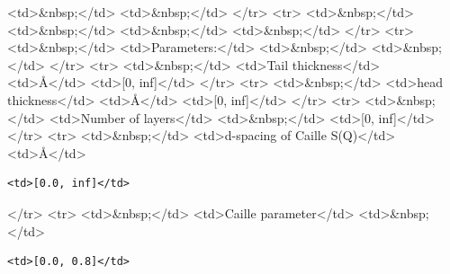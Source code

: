 \textless{}td\textgreater{}\&nbsp;\textless{}/td\textgreater{} \textless{}td\textgreater{}\&nbsp;\textless{}/td\textgreater{} \textless{}/tr\textgreater{} \textless{}tr\textgreater{} \textless{}td\textgreater{}\&nbsp;\textless{}/td\textgreater{} \textless{}td\textgreater{}\&nbsp;\textless{}/td\textgreater{} \textless{}td\textgreater{}\&nbsp;\textless{}/td\textgreater{} \textless{}td\textgreater{}\&nbsp;\textless{}/td\textgreater{} \textless{}/tr\textgreater{} \textless{}tr\textgreater{} \textless{}td\textgreater{}\&nbsp;\textless{}/td\textgreater{} \textless{}td\textgreater{}Parameters:\textless{}/td\textgreater{} \textless{}td\textgreater{}\&nbsp;\textless{}/td\textgreater{} \textless{}td\textgreater{}\&nbsp;\textless{}/td\textgreater{} \textless{}/tr\textgreater{} \textless{}tr\textgreater{} \textless{}td\textgreater{}\&nbsp;\textless{}/td\textgreater{} \textless{}td\textgreater{}Tail thickness\textless{}/td\textgreater{} \textless{}td\textgreater{}\AA{}\textless{}/td\textgreater{} \textless{}td\textgreater{}[0, inf]\textless{}/td\textgreater{} \textless{}/tr\textgreater{} \textless{}tr\textgreater{} \textless{}td\textgreater{}\&nbsp;\textless{}/td\textgreater{} \textless{}td\textgreater{}head thickness\textless{}/td\textgreater{} \textless{}td\textgreater{}\AA{}\textless{}/td\textgreater{} \textless{}td\textgreater{}[0, inf]\textless{}/td\textgreater{} \textless{}/tr\textgreater{} \textless{}tr\textgreater{} \textless{}td\textgreater{}\&nbsp;\textless{}/td\textgreater{} \textless{}td\textgreater{}Number of layers\textless{}/td\textgreater{} \textless{}td\textgreater{}\&nbsp;\textless{}/td\textgreater{} \textless{}td\textgreater{}[0, inf]\textless{}/td\textgreater{} \textless{}/tr\textgreater{} \textless{}tr\textgreater{} \textless{}td\textgreater{}\&nbsp;\textless{}/td\textgreater{} \textless{}td\textgreater{}d-spacing of Caille S(Q)\textless{}/td\textgreater{} \textless{}td\textgreater{}\AA{}\textless{}/td\textgreater{}

\begin{verbatim}
<td>[0.0, inf]</td>
\end{verbatim}

\textless{}/tr\textgreater{} \textless{}tr\textgreater{} \textless{}td\textgreater{}\&nbsp;\textless{}/td\textgreater{} \textless{}td\textgreater{}Caille parameter\textless{}/td\textgreater{} \textless{}td\textgreater{}\&nbsp;\textless{}/td\textgreater{}

\begin{verbatim}
<td>[0.0, 0.8]</td>
\end{verbatim}

